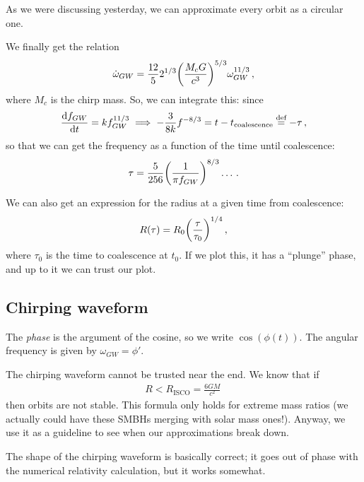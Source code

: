 \documentclass[main.tex]{subfiles}
\begin{document}

As we were discussing yesterday, we can approximate every orbit as a circular one. 

We finally get the relation 
%
\begin{align}
\dot{\omega}_{GW} = \frac{12}{5} 2^{1/3}
\qty(\frac{M_c G}{c^{3}})^{5/3} \omega_{GW}^{11/3}
\,,
\end{align}
%
where \(M_c\) is the chirp mass. 
So, we can integrate this: since 
%
\begin{align}
\dv{f_{GW}}{t} = k f^{11/3}_{GW} \implies - \frac{3}{8k} f^{-8/3} = t - t _{\text{coalescence}} 
\overset{\text{def}}{=} -\tau 
\,,
\end{align}
%
so that we can get the frequency as a function of the time until coalescence: 
%
\begin{align}
\tau = \frac{5}{256} \qty( \frac{1}{\pi f_{GW}})^{8/3} \dots
\,.
\end{align}

We can also get an expression for the radius at a given time from coalescence: 
%
\begin{align}
R(\tau ) = R_0 \qty(\frac{\tau }{\tau_0 })^{1/4}
\,,
\end{align}
%
where \(\tau_0 \) is the time to coalescence at \(t_0 \). 
If we plot this, it has a ``plunge'' phase, and up to it we can trust our plot. 

\subsection{Chirping waveform}

The \emph{phase} is the argument of the cosine, so we write \(\cos(\phi (t))\). 
The angular frequency is given by \(\omega_{GW} = \phi'\).

The chirping waveform cannot be trusted near the end. 
We know that if 
%
\begin{align}
R < R _{\text{ISCO}} = \frac{6GM}{c^2}
\,
\end{align}
%
then orbits are not stable. This formula only holds for extreme mass ratios (we actually could have these SMBHs merging with solar mass ones!). 
Anyway, we use it as a guideline to see when our approximations break down. 

The shape of the chirping waveform is basically correct; it goes out of phase with the numerical relativity calculation, but it works somewhat. 
\end{document}
